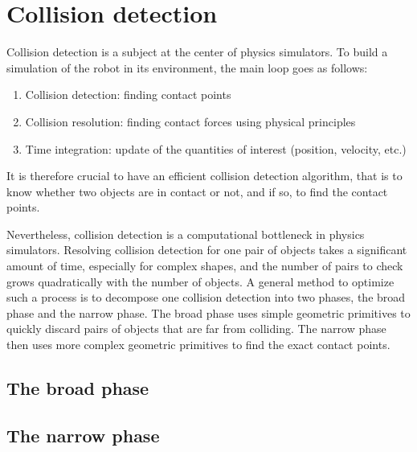\section{Collision detection}
Collision detection is a subject at the center of physics simulators. To build a simulation of the robot in its environment, the main loop goes as follows:
\begin{enumerate}
    \item Collision detection: finding contact points
    \item Collision resolution: finding contact forces using physical principles
    \item Time integration: update of the quantities of interest (position, velocity, etc.)
\end{enumerate}
It is therefore crucial to have an efficient collision detection algorithm, that is to know whether two objects are in contact or not, and if so, to find the contact points.

Nevertheless, collision detection is a computational bottleneck in physics simulators. Resolving collision detection for one pair of objects takes a significant amount of time, especially for complex shapes, and the number of pairs to check grows quadratically with the number of objects. A general method to optimize such a process is to decompose one collision detection into two phases, the broad phase and the narrow phase. The broad phase uses simple geometric primitives to quickly discard pairs of objects that are far from colliding. The narrow phase then uses more complex geometric primitives to find the exact contact points.

\subsection{The broad phase}

\subsection{The narrow phase}

\newpage